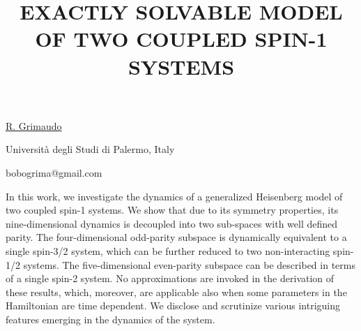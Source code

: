 \title{EXACTLY SOLVABLE MODEL OF TWO COUPLED SPIN-1 SYSTEMS}

\underline{R. Grimaudo} 

{\normalsize{\vspace{-4mm}
Universit\`{a} degli Studi di Palermo, Italy

\email bobogrima@gmail.com}}

In this work, we investigate the dynamics of a generalized Heisenberg model of two coupled spin-1
systems. We show that due to its symmetry properties, its nine-dimensional dynamics is decoupled
into two sub-spaces with well defined parity. The four-dimensional odd-parity subspace is
dynamically equivalent to a single spin-3/2 system, which can be further reduced to two non-interacting
spin-1/2 systems. The five-dimensional even-parity subspace can be described in terms
of a single spin-2 system. No approximations are invoked in the derivation of these results,
which, moreover, are applicable also when some parameters in the Hamiltonian are time dependent.
We disclose and scrutinize various intriguing features emerging in the dynamics of the system. 

%
%



\vspace{\baselineskip} 